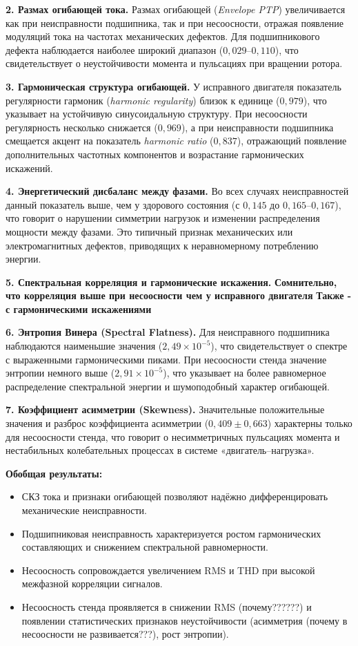 \textbf{2. Размах огибающей тока.}
Размах огибающей (\textit{Envelope PTP}) увеличивается как при неисправности подшипника, так и при несоосности, отражая появление модуляций тока на частотах механических дефектов. 
Для подшипникового дефекта наблюдается наиболее широкий диапазон ($0{,}029$–$0{,}110$), что свидетельствует о неустойчивости момента и пульсациях при вращении ротора.

\textbf{3. Гармоническая структура огибающей.}
У исправного двигателя показатель регулярности гармоник (\textit{harmonic regularity}) близок к единице ($0{,}979$), что указывает на устойчивую синусоидальную структуру. 
При несоосности регулярность несколько снижается ($0{,}969$), а при неисправности подшипника смещается акцент на показатель \textit{harmonic ratio} ($0{,}837$), отражающий появление дополнительных частотных компонентов и возрастание гармонических искажений.

\textbf{4. Энергетический дисбаланс между фазами.}
Во всех случаях неисправностей данный показатель выше, чем у здорового состояния (с $0{,}145$ до $0{,}165$–$0{,}167$), что говорит о нарушении симметрии нагрузок и изменении распределения мощности между фазами. 
Это типичный признак механических или электромагнитных дефектов, приводящих к неравномерному потреблению энергии.

\textbf{5. Спектральная корреляция и гармонические искажения.}
\textbf{Сомнительно, что корреляция выше при несоосности чем у исправного двигателя}
\textbf{Также - с гармоническими искажениями}

\textbf{6. Энтропия Винера (Spectral Flatness).}
Для неисправного подшипника наблюдаются наименьшие значения ($2{,}49\times10^{-5}$), что свидетельствует о спектре с выраженными гармоническими пиками. 
При несоосности стенда значение энтропии немного выше ($2{,}91\times10^{-5}$), что указывает на более равномерное распределение спектральной энергии и шумоподобный характер огибающей.

\textbf{7. Коэффициент асимметрии (Skewness).}
Значительные положительные значения и разброс коэффициента асимметрии ($0{,}409 \pm 0{,}663$) характерны только для несоосности стенда, что говорит о несимметричных пульсациях момента и нестабильных колебательных процессах в системе «двигатель–нагрузка».

\bigskip
\textbf{Обобщая результаты:}
\begin{itemize}
    \item СКЗ тока и признаки огибающей позволяют надёжно дифференцировать механические неисправности.
    \item Подшипниковая неисправность характеризуется ростом гармонических составляющих и снижением спектральной равномерности.
    \item Несоосность сопровождается увеличением RMS и THD при высокой межфазной корреляции сигналов.
    \item Несоосность стенда проявляется в снижении RMS (почему??????) и появлении статистических признаков неустойчивости (асимметрия (почему в несоосности не развивается???), рост энтропии).
\end{itemize}
